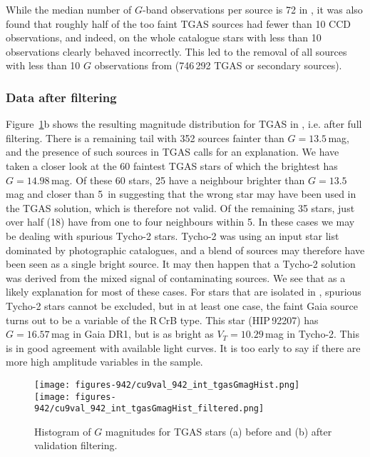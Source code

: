 While the median number of $G$-band observations per source is 72 in {},
it was also found that roughly half of the too faint TGAS sources had fewer 
than 10 CCD observations, and indeed, on the whole catalogue
stars with less than 10 observations clearly behaved incorrectly.
This led to the removal of all sources with less than 10 $G$ observations from {} 
(746\,292 TGAS or secondary sources).

\subsubsection{Data after filtering}

Figure~\ref{fig:942_tgashist}b shows the resulting magnitude distribution for TGAS
in {}, i.e. after full filtering. There is a remaining tail with 352 sources fainter 
than $G = 13.5$\,mag, and the presence 
of such sources in TGAS calls for an explanation. We have taken a closer look 
at the 60 faintest TGAS stars of which the brightest
has $G = 14.98$\,mag. Of these 60 stars, 25 have a neighbour brighter than $G =
13.5$\,mag and closer than 5\arcsec\ in {} suggesting that the wrong star
may have been used in the TGAS solution, which is therefore not valid.  Of the
remaining 35 stars, just over half (18) have from one to four neighbours within
5\arcsec. In these cases we may be dealing with spurious Tycho-2 stars.
Tycho-2 \citep{2000A&A...357..367H} was using an input star list dominated by
photographic catalogues, and a blend of sources may therefore have been seen as
a single bright source. It may then happen that a Tycho-2 solution was derived
from the mixed signal of contaminating sources. We see that as a likely
explanation for most of these cases. For stars that are isolated in {},
spurious Tycho-2 stars cannot be excluded, but in at least one case, the faint
Gaia source turns out to be a variable of the R\,CrB type. This star
(HIP\,92207) has $G = 16.57$\,mag in Gaia DR1, but is as bright as $V_T =
10.29$\,mag in Tycho-2. This is in good agreement with available light curves.
It is too early to say if there are more high amplitude variables in the
sample.

\begin{figure}
\centering
\texttt{[image: figures-942/cu9val\_942\_int\_tgasGmagHist.png]}
\texttt{[image: figures-942/cu9val\_942\_int\_tgasGmagHist\_filtered.png]}
\caption{Histogram of $G$ magnitudes for TGAS stars (a) before
and (b) after validation filtering.}
\label{fig:942_tgashist}
\end{figure}



